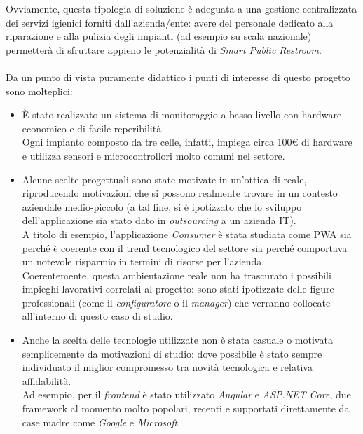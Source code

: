 \documentclass[12pt]{article}
\begin{document}
Ovviamente, questa tipologia di soluzione è adeguata a una gestione centralizzata dei servizi igienici forniti dall'azienda/ente: avere del personale dedicato alla riparazione e alla pulizia degli impianti (ad esempio su scala nazionale) permetterà di sfruttare appieno le potenzialità di \textit{Smart Public Restroom}.\\\\
Da un punto di vista puramente didattico i punti di interesse di questo progetto sono molteplici:
\begin{itemize}
\item È stato realizzato un sistema di monitoraggio a basso livello con hardware economico e di facile reperibilità.\\
Ogni impianto composto da tre celle, infatti, impiega circa 100€ di hardware e utilizza sensori e microcontrollori molto comuni nel settore.
\item Alcune scelte progettuali sono state motivate in un'ottica di reale, riproducendo motivazioni che si possono realmente trovare in un contesto aziendale medio-piccolo (a tal fine, si è ipotizzato che lo sviluppo dell'applicazione sia stato dato in \textit{outsourcing} a un azienda IT).\\
A titolo di esempio, l'applicazione \textit{Consumer} è stata studiata come PWA sia perché è coerente con il trend tecnologico del settore sia perché comportava un notevole risparmio in termini di risorse per l'azienda.\\
Coerentemente, questa ambientazione reale non ha trascurato i possibili impieghi lavorativi correlati al progetto: sono stati ipotizzate delle figure professionali (come il \textit{configuratore} o il \textit{manager}) che verranno collocate all'interno di questo caso di studio.
\item Anche la scelta delle tecnologie utilizzate non è stata casuale o motivata semplicemente da motivazioni di studio: dove possibile è stato sempre individuato il miglior compromesso tra novità tecnologica e relativa affidabilità.\\
Ad esempio, per il \textit{frontend} è stato utilizzato \textit{Angular} e \textit{ASP.NET Core}, due framework al momento molto popolari, recenti e supportati direttamente da case madre come \textit{Google} e \textit{Microsoft}.
\end{itemize}
\end{document}
